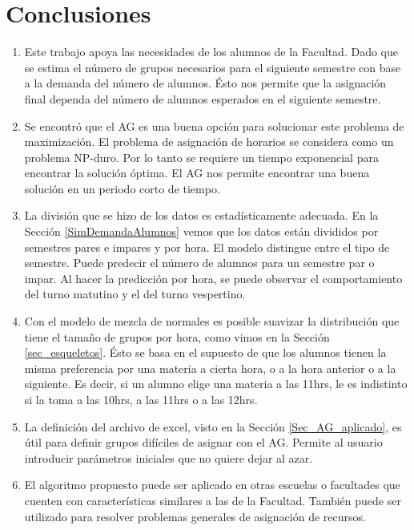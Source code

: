 \chapter{Conclusiones}

\begin{enumerate}
\item Este trabajo apoya las necesidades de los alumnos de la Facultad. Dado que se estima el número de grupos necesarios para el siguiente semestre con base a la demanda del número de alumnos. Ésto nos permite que la asignación final dependa del número de alumnos esperados en el siguiente semestre.

\item Se encontró que el AG es una buena opción para solucionar este problema de maximización. El problema de asignación de horarios se considera como un problema NP-duro. Por lo tanto se requiere un tiempo exponencial para encontrar la solución óptima. El AG nos permite encontrar una buena solución en un periodo corto de tiempo.%

\item La división que se hizo de los datos es estadísticamente adecuada. En la Sección \ref{SimDemandaAlumnos} vemos que los datos están divididos por semestres pares e impares y por hora. El modelo distingue entre el tipo de semestre. Puede predecir el número de alumnos para un semestre par o impar. Al hacer la predicción por hora, se puede observar el comportamiento del turno matutino y el del turno vespertino.

\item Con el modelo de mezcla de normales es posible suavizar la distribución que tiene el tamaño de grupos por hora, como vimos en la Sección \ref{sec_esqueletos}. Ésto se basa en el supuesto de que los alumnos tienen la misma preferencia por una materia a cierta hora, o a la hora anterior o a la siguiente. Es decir, si un alumno elige una materia a las 11hrs, le es indistinto si la toma a las 10hrs, a las 11hrs o a las 12hrs.

\item La definición del archivo de excel, visto en la Sección \ref{Sec_AG_aplicado}, es útil para definir grupos difíciles de asignar con el AG. Permite al usuario introducir parámetros iniciales que no quiere dejar al azar.

\item El algoritmo propuesto puede ser aplicado en otras escuelas o facultades que cuenten con características similares a las de la Facultad. También puede ser utilizado para resolver problemas generales de asignación de recursos.


\end{enumerate}
